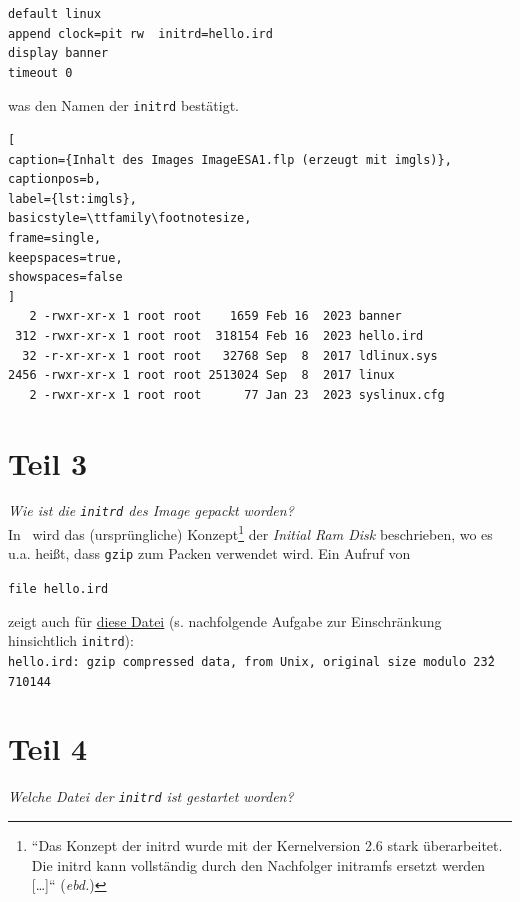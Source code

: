 \begin{verbatim}
default linux
append clock=pit rw  initrd=hello.ird
display banner
timeout 0
\end{verbatim}

\noindent
was den Namen der \texttt{initrd} bestätigt.

\vspace{5mm}

\begin{lstlisting}[
caption={Inhalt des Images ImageESA1.flp (erzeugt mit imgls)},
captionpos=b,
label={lst:imgls},
basicstyle=\ttfamily\footnotesize,
frame=single,
keepspaces=true,
showspaces=false
]
   2 -rwxr-xr-x 1 root root    1659 Feb 16  2023 banner
 312 -rwxr-xr-x 1 root root  318154 Feb 16  2023 hello.ird
  32 -r-xr-xr-x 1 root root   32768 Sep  8  2017 ldlinux.sys
2456 -rwxr-xr-x 1 root root 2513024 Sep  8  2017 linux
   2 -rwxr-xr-x 1 root root      77 Jan 23  2023 syslinux.cfg
\end{lstlisting}


\section{Teil 3}

\textit{Wie ist die \texttt{initrd} des Image gepackt worden?}\\

\noindent
In~\cite[112]{ES4} wird das (ursprüngliche) Konzept\footnote{
``Das Konzept der initrd wurde mit der Kernelversion 2.6 stark überarbeitet.
Die initrd kann vollständig durch den Nachfolger initramfs ersetzt werden [\ldots]`` (\textit{ebd.})
} der \textit{Initial Ram Disk} beschrieben, wo es u.a. heißt, dass \texttt{gzip} zum Packen verwendet wird.
Ein Aufruf von

\begin{center}
\texttt{file hello.ird}
\end{center}

\noindent
zeigt auch für \underline{diese Datei} (s. nachfolgende Aufgabe zur Einschränkung hinsichtlich \texttt{initrd}):\\

\noindent
\texttt{hello.ird: gzip compressed data, from Unix, original size modulo 2\^32 710144}

\section{Teil 4}

\textit{Welche Datei der \texttt{initrd} ist gestartet worden?}\\

